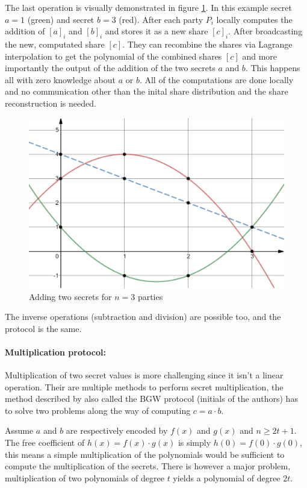 The last operation is visually demonstrated in figure \ref{fig:addsecrets}. In this example secret $a=1$ (green) and secret $b=3$ (red). After each party $P_i$ locally computes the addition of $[a]_i$ and $[b]_i$ and stores it as a new share $[c]_i$. After broadcasting the new, computated share $[c]$. They can recombine the shares via Lagrange interpolation to get the polynomial of the combined shares $[c]$ and more importantly the output of the addition of the two secrets $a$ and $b$. This happens all with zero knowledge about $a$ or $b$. All of the computations are done locally and no communication other than the inital share distribution and the share reconstruction is needed.

\begin{figure}
  \includegraphics[width=\linewidth]{plots/addsecrets.png}
  \caption{Adding two secrets for $n=3$ parties}
  \label{fig:addsecrets}
\end{figure}

The inverse operations (subtraction and division) are possible too, and the protocol is the same.

\paragraph{Multiplication protocol:}
Multiplication of two secret values is more challenging since it isn't a linear operation. Their are multiple methods to perform secret multiplication, the method described by \cite{ben1988completeness} also called the BGW protocol (initials of the authors) has to solve two problems along the way of computing $c = a \cdot b$.

Assume $a$ and $b$ are respectively encoded by $f(x)$ and $g(x)$ and $n \geq 2t + 1$. The free coefficient of $h(x) = f(x) \cdot g(x)$ is simply $h(0) = f(0) \cdot g(0)$, this means a simple multiplication of the polynomials would be sufficient to compute the multiplication of the secrets. There is however a major problem, multiplication of two polynomials of degree $t$ yields a polynomial of degree $2t$.

